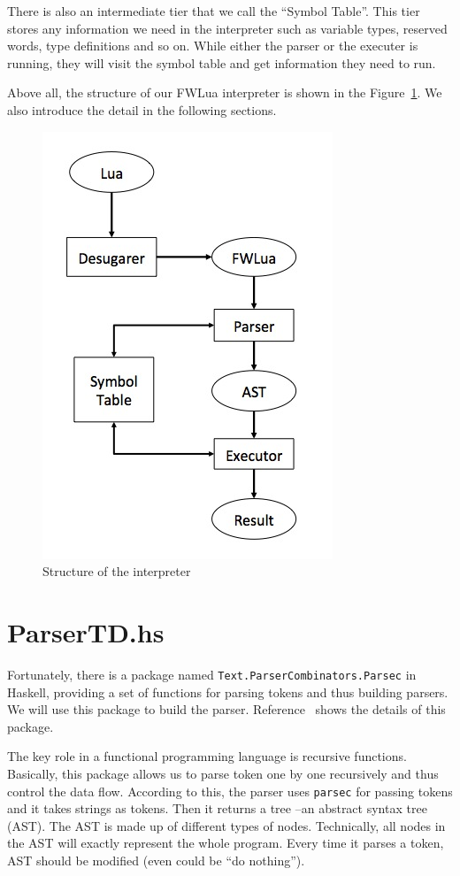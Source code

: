 There is also an intermediate tier that we call the ``Symbol Table''. This tier stores any information we need in the interpreter such as variable types, reserved words, type definitions and so on. While either the parser or the executer is running, they will visit the symbol table and get information they need to run. 

Above all, the structure of our FWLua interpreter is shown in the Figure~\ref {fig:structure}. We also introduce the detail in the following sections. 

\begin{figure}
\centering
\caption{Structure of the interpreter}
\label{fig:structure}
\includegraphics[scale = 0.9]{Interpreter}
\end{figure}

\section{ParserTD.hs}
Fortunately, there is a package named {\tt Text.ParserCombinators.Parsec} in Haskell, providing a set of functions for parsing tokens and thus building parsers. We will use this package to build the parser. Reference~\cite{IHAS} shows the details of this package.

The key role in a functional programming language is recursive functions. Basically, this package allows us to parse token one by one recursively and thus control the data flow. According to this, the parser uses {\tt parsec} for passing tokens and it takes strings as tokens. Then it returns a tree --an abstract syntax tree (AST). The AST is made up of different types of nodes. Technically, all nodes in the AST will exactly represent the whole program. Every time it parses a token, AST should be modified (even could be ``do nothing'').

